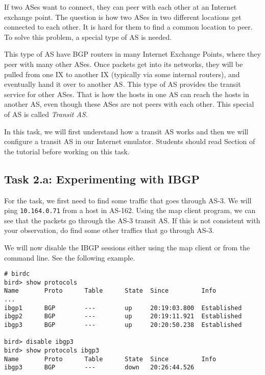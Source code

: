 If two ASes want to connect, they can peer with each other
at an Internet exchange point. The question is how two ASes in two different locations
get connected to each other. It is hard for them
to find a common location to peer. To solve this problem,
a special type of AS is needed.

This type of AS have BGP routers in many Internet
Exchange Points, where they peer with many other ASes. Once packets get into
its networks, they will be pulled from one IX to another IX (typically via
some internal routers), and eventually
hand it over to another AS. This type of AS provides the transit
service for other ASes. That is how the hosts in one AS can reach the hosts in
another AS, even though these ASes are not peers with each other.
This special of AS is called \textit{Transit AS}.

In this task, we will first understand how a transit AS works and
then we will configure a transit AS in our Internet emulator. 
Students should read Section \transitas of the tutorial before working on this task.

\subsection{Task 2.a: Experimenting with IBGP} 


For the task, we first need to find some traffic that 
goes through AS-3. We will ping \texttt{10.164.0.71} from a host in AS-162. Using the 
map client program, we can see that the packets go through
the AS-3 transit AS. If this is not consistent with your observation,
do find some other traffics that go through AS-3. 

We will now disable the IBGP sessions either using the map client or 
from the command line. See the following example.

\begin{lstlisting}
# birdc
bird> show protocols
Name       Proto      Table      State  Since         Info
...
ibgp1      BGP        ---        up     20:19:03.800  Established
ibgp2      BGP        ---        up     20:19:11.921  Established
ibgp3      BGP        ---        up     20:20:50.238  Established

bird> disable ibgp3 
bird> show protocols ibgp3
Name       Proto      Table      State  Since         Info
ibgp3      BGP        ---        down   20:26:44.526
\end{lstlisting}
 
